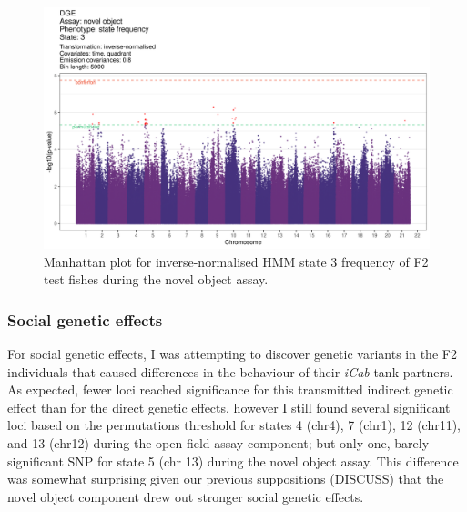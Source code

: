 \documentclass[
]{book}
\begin{document}
\begin{figure}
\includegraphics[width=1\linewidth]{figs/mikk_behaviour/manhattans/dge_no_3_time-quadrant} \caption{Manhattan plot for inverse-normalised HMM state 3 frequency of F2 test fishes during the novel object assay.}\label{fig:F2-man-dge-no-3}
\end{figure}

\hypertarget{social-genetic-effects-3}{%
\subsubsection{Social genetic effects}\label{social-genetic-effects-3}}

For social genetic effects, I was attempting to discover genetic variants in the F2 individuals that caused differences in the behaviour of their \emph{\textcolor{iCab_424B4D}{iCab}} tank partners. As expected, fewer loci reached significance for this transmitted indirect genetic effect than for the direct genetic effects, however I still found several significant loci based on the permutations threshold for states 4 (chr4), 7 (chr1), 12 (chr11), and 13 (chr12) during the open field assay component; but only one, barely significant SNP for state 5 (chr 13) during the novel object assay. This difference was somewhat surprising given our previous suppositions (DISCUSS) that the novel object component drew out stronger social genetic effects.
\end{document}
